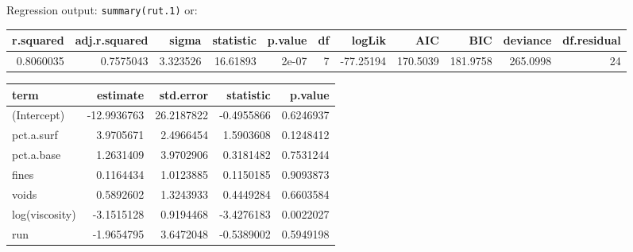 \begin{frame}[fragile]{Regression output: \texttt{summary(rut.1)} or:}
\protect\hypertarget{regression-output-summaryrut.1-or}{}
\footnotesize

\begin{Shaded}
\begin{Highlighting}[]
\NormalTok{)}
\end{Highlighting}
\end{Shaded}

\begin{longtable}[]{@{}rrrrrrrrrrr@{}}
\toprule
r.squared & adj.r.squared & sigma & statistic & p.value & df & logLik &
AIC & BIC & deviance & df.residual\tabularnewline
\midrule
\endhead
0.8060035 & 0.7575043 & 3.323526 & 16.61893 & 2e-07 & 7 & -77.25194 &
170.5039 & 181.9758 & 265.0998 & 24\tabularnewline
\bottomrule
\end{longtable}

\begin{Shaded}
\begin{Highlighting}[]
\NormalTok{)}
\end{Highlighting}
\end{Shaded}

\begin{longtable}[]{@{}lrrrr@{}}
\toprule
term & estimate & std.error & statistic & p.value\tabularnewline
\midrule
\endhead
(Intercept) & -12.9936763 & 26.2187822 & -0.4955866 &
0.6246937\tabularnewline
pct.a.surf & 3.9705671 & 2.4966454 & 1.5903608 &
0.1248412\tabularnewline
pct.a.base & 1.2631409 & 3.9702906 & 0.3181482 &
0.7531244\tabularnewline
fines & 0.1164434 & 1.0123885 & 0.1150185 & 0.9093873\tabularnewline
voids & 0.5892602 & 1.3243933 & 0.4449284 & 0.6603584\tabularnewline
log(viscosity) & -3.1515128 & 0.9194468 & -3.4276183 &
0.0022027\tabularnewline
run & -1.9654795 & 3.6472048 & -0.5389002 & 0.5949198\tabularnewline
\bottomrule
\end{longtable}

\normalsize
\end{frame}

